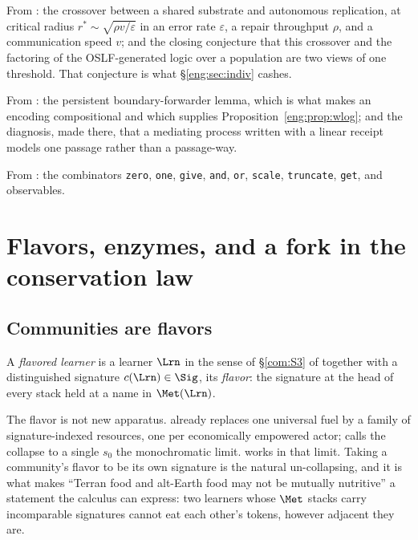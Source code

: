 From \cite{compaut}: the crossover between a shared substrate and
autonomous replication, at critical radius $r^\ast \sim
\sqrt{\rho v / \varepsilon}$ in an error rate $\varepsilon$, a repair
throughput $\rho$, and a communication speed $v$; and the closing
conjecture that this crossover and the factoring of the OSLF-generated
logic over a population are two views of one threshold. That conjecture is
what \S\ref{eng:sec:indiv} cashes.

From \cite{KnotsNote}: the persistent boundary-forwarder lemma, which is what
makes an encoding compositional and which supplies
Proposition~\ref{eng:prop:wlog}; and the diagnosis, made there, that a
mediating process written with a linear receipt models one passage rather
than a passage-way.

From \cite{SPJ2000}: the combinators \texttt{zero}, \texttt{one},
\texttt{give}, \texttt{and}, \texttt{or}, \texttt{scale},
\texttt{truncate}, \texttt{get}, and observables.

\section{Flavors, enzymes, and a fork in the conservation law}\label{eng:S3}
\label{eng:sec:fork}

\subsection{Communities are flavors}\label{eng:S3.1}

\begin{definition}\label{eng:coloured-learner}
A \emph{flavored learner} is a learner $\Lrn$ in the sense of
\S\ref{com:S3} of \chComp together with a distinguished signature
$c(\Lrn) \in \Sig$, its \emph{flavor}: the signature at the head of every
stack held at a name in $\Met(\Lrn)$.
\end{definition}

The flavor is not new apparatus. \cite{CARho} already replaces one
universal fuel by a family of signature-indexed resources, one per
economically empowered actor; \cite[\S6]{CARho} calls the collapse to a
single $s_0$ the monochromatic limit. \chComp works in that limit.
Taking a community's flavor to be its own signature is the natural
un-collapsing, and it is what makes ``Terran food and alt-Earth food may
not be mutually nutritive'' a statement the calculus can express: two
learners whose $\Met$ stacks carry incomparable signatures cannot eat each
other's tokens, however adjacent they are.


